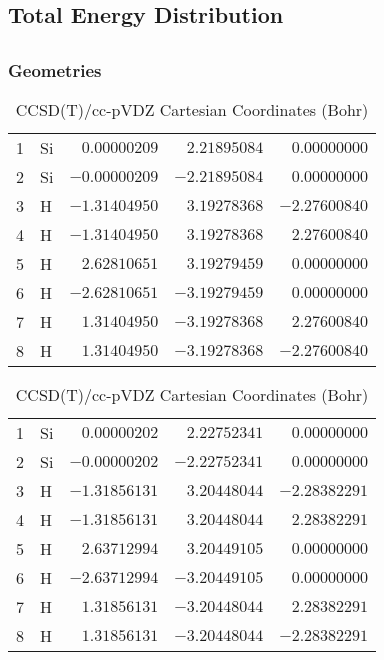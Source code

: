 \documentclass[10pt,oneside]{article}
\begin{document}
\begin{table}
\subsection*{Total Energy Distribution}
\centering\end{table}

\clearpage

\subsection{}

\begin{table}[h!]
\subsubsection*{Geometries}
\begin{multicols}{2}
\centering
\caption{CCSD(T)/cc-pVTZ Cartesian Coordinates (Bohr)}
\begin{tabular}{llrrr}
\toprule
1  & Si & $ 0.00000209$ & $ 2.21895084$ & $ 0.00000000$ \\
2  & Si & $-0.00000209$ & $-2.21895084$ & $ 0.00000000$ \\
3  & H  & $-1.31404950$ & $ 3.19278368$ & $-2.27600840$ \\
4  & H  & $-1.31404950$ & $ 3.19278368$ & $ 2.27600840$ \\
5  & H  & $ 2.62810651$ & $ 3.19279459$ & $ 0.00000000$ \\
6  & H  & $-2.62810651$ & $-3.19279459$ & $ 0.00000000$ \\
7  & H  & $ 1.31404950$ & $-3.19278368$ & $ 2.27600840$ \\
8  & H  & $ 1.31404950$ & $-3.19278368$ & $-2.27600840$ \\
\bottomrule
\end{tabular}
\caption{CCSD(T)/cc-pVDZ Cartesian Coordinates (Bohr)}
\begin{tabular}{llrrr}
\toprule
1  & Si & $ 0.00000202$ & $ 2.22752341$ & $ 0.00000000$ \\
2  & Si & $-0.00000202$ & $-2.22752341$ & $ 0.00000000$ \\
3  & H  & $-1.31856131$ & $ 3.20448044$ & $-2.28382291$ \\
4  & H  & $-1.31856131$ & $ 3.20448044$ & $ 2.28382291$ \\
5  & H  & $ 2.63712994$ & $ 3.20449105$ & $ 0.00000000$ \\
6  & H  & $-2.63712994$ & $-3.20449105$ & $ 0.00000000$ \\
7  & H  & $ 1.31856131$ & $-3.20448044$ & $ 2.28382291$ \\
8  & H  & $ 1.31856131$ & $-3.20448044$ & $-2.28382291$ \\
\bottomrule
\end{tabular}
\end{multicols}
\end{table}
\end{document}
